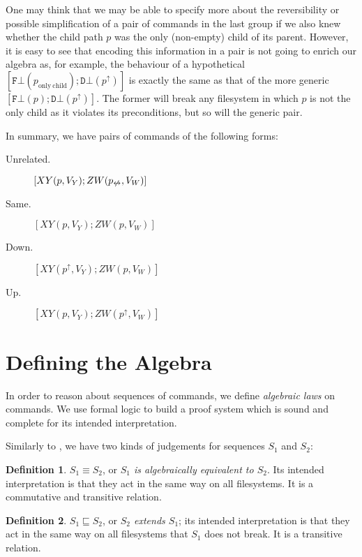 \documentclass[12pt]{article}
\newcommand{\empt}{\bot}
\newcommand{\pp}{p^\uparrow} %
\newcommand{\np}{p_{\centernot\leftrightarrow}} %
\newcommand{\fscommand}[2]{{#1#2}}
\newcommand{\fsregcommandchar}[1]{\mathtt{#1}}
\newcommand{\fsregcommand}[2]{\fscommand{\fsregcommandchar{#1}}{\fsregcommandchar{#2}}}
\newcommand{\cfb}{\fsregcommand{F}{\empt}}
\newcommand{\cdb}{\fsregcommand{D}{\empt}}
\newcommand{\cxy}{\fscommand{X}{Y}}
\newcommand{\czw}{\fscommand{Z}{W}}
\newcommand{\eqext}{\sqsubseteq}
\theoremstyle{definition}
\newtheorem{mydef}{Definition}
\begin{document}
One may think that we may be able to specify more about the reversibility
or possible simplification of a pair of commands in the last group if we also
knew whether the child path $p$ was the only (non-empty) child of its parent.
However, it is easy to see that encoding this information in a pair
is not going to enrich our algebra as, for example,
the behaviour of a hypothetical $[\cfb(p_{\mathrm{only\ child}}); \cdb(\pp)]$
is exactly the same as that of the more generic
$[\cfb(p); \cdb(\pp)]$. The former will break any filesystem in which
$p$ is not the only child as it violates its preconditions, but so will
the generic pair.


In summary, we have pairs of commands
of the following forms:
\begin{description}
\item[Unrelated.] \( [\cxy(p,V_Y); \czw(\np,V_W)] \)
\item[Same.] \( [\cxy(p,V_Y); \czw(p,V_W)] \)
\item[Down.] \( [\cxy(\pp,V_Y); \czw(p,V_W)] \)
\item[Up.] \( [\cxy(p,V_Y); \czw(\pp,V_W)] \)
\end{description}


\section{Defining the Algebra}

In order to reason about sequences of commands, we define \emph{algebraic laws} on
commands. We use formal logic to build a proof system which is sound and
complete for its intended interpretation.

Similarly to \cite{NREC:alg}, we have two kinds of judgements
for sequences \(S_1\) and \(S_2\):
\begin{mydef}
\(S_1\equiv S_2\), or \emph{\(S_1\) is algebraically equivalent to
\(S_2\)}. Its intended interpretation is that they act in the same way on all
filesystems. It is a commutative and transitive relation.
\end{mydef}
\begin{mydef}
\(S_1\eqext S_2\), or \emph{\(S_2\) extends \(S_1\)}; its intended
interpretation is that they act in the same way on all
filesystems that \(S_1\) does not break. It is a transitive relation.
\end{mydef}
\end{document}
